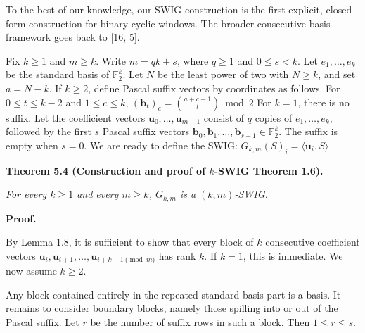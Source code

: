 \documentclass[10pt,a4paper]{article}
\begin{document}
To the best of our knowledge, our SWIG construction is the first explicit, closed-form construction for binary cyclic windows. The broader consecutive-basis framework goes back to [16, 5].\par




Fix $k\geq 1$ and $m\geq k$. Write $m=qk+s$, where $q\geq 1$ and $0\leq s<k$. Let $e_{1},\ldots,e_{k}$ be the standard basis of $\mathbb{F}_{2}^{k}$. Let $N$ be the least power of two with $N\geq k$, and set $a=N-k$. If $k\geq 2$, define Pascal suffix vectors by coordinates as follows. For $0\leq t\leq k-2$ and $1\leq c\leq k$,
$(\mathbf{b}_{t})_{c}=\binom{a+c-1}{t}\bmod 2$
For $k=1$, there is no suffix. Let the coefficient vectors $\mathbf{u}_{0},\ldots,\mathbf{u}_{m-1}$ consist of $q$ copies of $e_{1},\ldots,e_{k}$, followed by the first $s$ Pascal suffix vectors ${\mathbf{b}_{0}},{\mathbf{b}_{1}},\ldots,{\mathbf{b}_{s-1}}\in\mathbb{F}^{k}_{2}$. The suffix is empty when $s=0$. We are ready to define the SWIG:
$G_{k,m}(S)_{i}=\langle\mathbf{u}_{i},S\rangle$\par





\par\medskip\noindent\textbf{
\textbf{Theorem 5.4}\textbf{ }(Construction and proof of $k$-SWIG Theorem 1.6)\textbf{.}
}\par



\emph{For every $k\geq 1$ and every $m\geq k$, $G_{k,m}$ is a
$(k,m)$-SWIG.}\par






\par\medskip\noindent\textbf{Proof.}\par




By Lemma 1.8, it is sufficient to show that every
block of $k$ consecutive coefficient vectors
${\mathbf{u}_{i}},{\mathbf{u}_{i+1}},\ldots,{\mathbf{u}_{i+k-1\pmod{m}}}$
has rank $k$. If $k=1$, this is immediate.
We now assume $k\geq 2$.\par




Any block contained entirely in the repeated standard-basis part is a basis.
It remains to consider boundary blocks, namely those spilling into or out of the Pascal suffix.
Let $r$ be the number of suffix rows in such a block. Then $1\leq r\leq s$.\par
\end{document}

